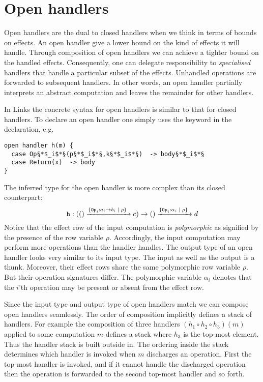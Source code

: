 \section{Open handlers}\label{sec:openhandlers}
Open handlers are the dual to closed handlers when we think in terms of bounds on effects. An open handler give a lower bound on the kind of effects it will handle. Through composition of open handlers we can achieve a tighter bound on the handled effects. Consequently, one can delegate responsibility to \emph{specialised} handlers that handle a particular subset of the effects. Unhandled operations are forwarded to subsequent handlers. In other words, an open handler partially interprets an abstract computation and leaves the remainder for other handlers.

In Links the concrete syntax for open handlers is similar to that for closed handlers. To declare an open handler one simply uses the keyword  in the declaration, e.g.
\begin{lstlisting}[style=links]
open handler h(m) {
  case Op§*$_i$*§(p§*$_i$*§,k§*$_i$*§)  -> body§*$_i$*§
  case Return(x)  -> body
}
\end{lstlisting}
The inferred type for the open handler  is more complex than its closed counterpart:
\[ \texttt{h} : (() \xrightarrow{ \{ \texttt{Op}_i: a_i \to b_i \; | \; \rho\}\; } c) \to () \xrightarrow{ \{ \texttt{Op}_i: \alpha_i \; | \; \rho\}\;} d\]
Notice that the effect row of the input computation is \emph{polymorphic} as signified by the presence of the row variable $\rho$. Accordingly, the input computation may perform more operations than the handler handles. The output type of an open handler looks very similar to its input type. The input as well as the output is a thunk. Moreover, their effect rows share the same polymorphic row variable $\rho$. But their operation signatures differ. The polymorphic variable $\alpha_i$ denotes that the $i$'th operation may be present or absent from the effect row.

Since the input type and output type of open handlers match we can compose open handlers seamlessly. The order of composition implicitly defines a stack of handlers. For example the composition of three handlers $(h_1 \circ h_2 \circ h_3)(m)$ applied to some computation $m$ defines a stack where $h_3$ is the top-most element. Thus the handler stack is built outside in. The ordering inside the stack determines which handler is invoked when $m$ discharges an operation. First the top-most handler is invoked, and if it cannot handle the discharged operation then the operation is forwarded to the second top-most handler and so forth.


